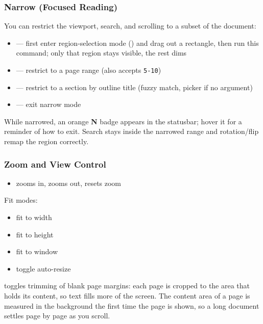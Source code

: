 \documentclass[a4paper,12pt]{article}
\begin{document}
\subsubsection{Narrow (Focused Reading)}

You can restrict the viewport, search, and scrolling to a subset of the document:
\begin{itemize}[leftmargin=*]
    \item {} — first enter region-selection mode () and drag out a rectangle, then run this command; only that region stays visible, the rest dims
    \item {} — restrict to a page range (also accepts \texttt{5-10})
    \item {} — restrict to a section by outline title (fuzzy match, picker if no argument)
    \item {} — exit narrow mode
\end{itemize}

While narrowed, an orange \textbf{N} badge appears in the statusbar; hover it for a reminder of how to exit. Search stays inside the narrowed range and rotation/flip remap the region correctly.

\subsubsection{Zoom and View Control}
\begin{itemize}[leftmargin=*]
    \item \keys{=} zooms in, \quad \keys{-} zooms out, \quad {} resets zoom
\end{itemize}

Fit modes:
\begin{itemize}[leftmargin=*]
    \item {} fit to width
    \item {} fit to height
    \item {} fit to window
    \item {} toggle auto-resize
\end{itemize}

 toggles trimming of blank page margins: each page is cropped to the area that holds its content, so text fills more of the screen. The content area of a page is measured in the background the first time the page is shown, so a long document settles page by page as you scroll.
\end{document}
